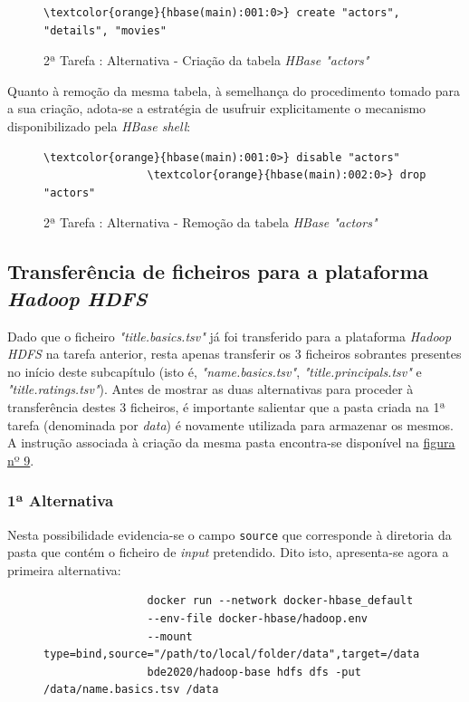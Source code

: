 \documentclass[a4paper]{report}
\begin{document}
{		\begin{figure}[H]
			{
				\color{teal}
				\begin{Verbatim}[commandchars=\\\{\}]
				\textcolor{orange}{hbase(main):001:0>} create "actors", "details", "movies"
				\end{Verbatim}
			}
			\caption{2ª Tarefa : Alternativa - Criação da tabela \textit{HBase "actors"}}
			\label{fig:14}
		\end{figure}
		
		Quanto à remoção da mesma tabela, à semelhança do procedimento tomado para a sua criação, adota-se a estratégia de usufruir explicitamente o mecanismo disponibilizado pela \textit{HBase shell}:
		\begin{figure}[H]
			{
				\color{teal}
				\begin{Verbatim}[commandchars=\\\{\}]
				\textcolor{orange}{hbase(main):001:0>} disable "actors"
				\textcolor{orange}{hbase(main):002:0>} drop "actors"
				\end{Verbatim}
			}
			\caption{2ª Tarefa : Alternativa - Remoção da tabela \textit{HBase "actors"}}
			\label{fig:15}
		\end{figure}
		
		\subsection{Transferência de ficheiros para a plataforma \textit{Hadoop HDFS}} \label{subsec:Task2-2}
		Dado que o ficheiro \textit{"title.basics.tsv"} já foi transferido para a plataforma \textit{Hadoop HDFS} na tarefa anterior, resta apenas transferir os 3 ficheiros sobrantes presentes no início deste subcapítulo (isto é, \textit{"name.basics.tsv"}, \textit{"title.principals.tsv"} e \textit{"title.ratings.tsv"}).
		Antes de mostrar as duas alternativas para proceder à transferência destes 3 ficheiros, é importante salientar que a pasta criada na 1ª tarefa (denominada por \textit{data}) é novamente utilizada para armazenar os mesmos. A instrução associada à criação da mesma pasta encontra-se disponível na \hyperref[fig:9]{figura nº 9}.
		
		\subsubsection{1ª Alternativa}
		Nesta possibilidade evidencia-se o campo \texttt{source} que corresponde à diretoria da pasta que contém o ficheiro de \textit{input} pretendido.
		Dito isto, apresenta-se agora a primeira alternativa:
		\begin{figure}[H]
			{
				\color{teal}
				\begin{verbatim}
				docker run --network docker-hbase_default
				--env-file docker-hbase/hadoop.env
				--mount type=bind,source="/path/to/local/folder/data",target=/data
				bde2020/hadoop-base hdfs dfs -put /data/name.basics.tsv /data
				

\end{verbatim}}
\end{figure}}
\end{document}
